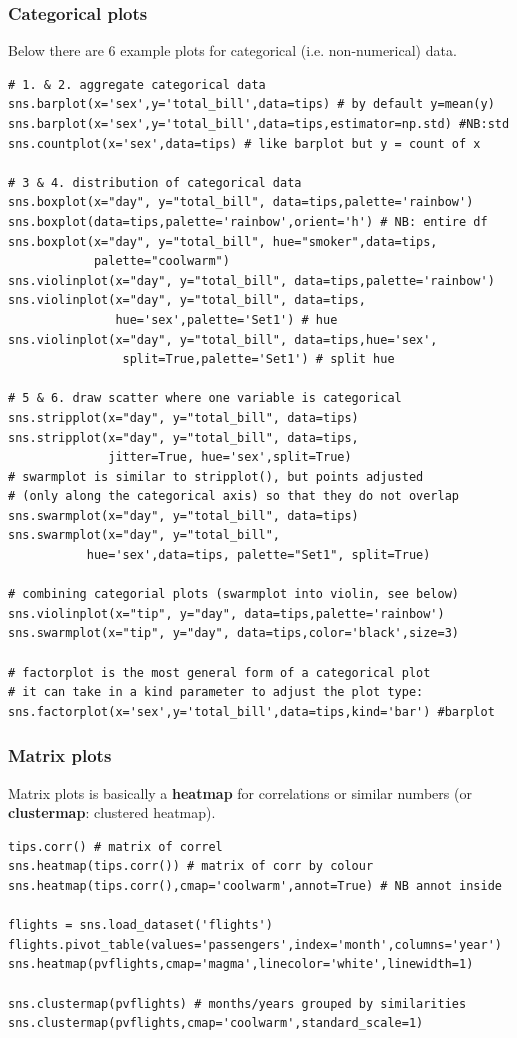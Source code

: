\documentclass[11pt]{article}
\begin{document}
\subsubsection{Categorical plots}
Below there are 6 example plots for categorical (i.e. non-numerical) data.
\begin{lstlisting}
# 1. & 2. aggregate categorical data
sns.barplot(x='sex',y='total_bill',data=tips) # by default y=mean(y)
sns.barplot(x='sex',y='total_bill',data=tips,estimator=np.std) #NB:std
sns.countplot(x='sex',data=tips) # like barplot but y = count of x

# 3 & 4. distribution of categorical data
sns.boxplot(x="day", y="total_bill", data=tips,palette='rainbow')
sns.boxplot(data=tips,palette='rainbow',orient='h') # NB: entire df
sns.boxplot(x="day", y="total_bill", hue="smoker",data=tips,
            palette="coolwarm")
sns.violinplot(x="day", y="total_bill", data=tips,palette='rainbow')
sns.violinplot(x="day", y="total_bill", data=tips,
               hue='sex',palette='Set1') # hue
sns.violinplot(x="day", y="total_bill", data=tips,hue='sex',
                split=True,palette='Set1') # split hue

# 5 & 6. draw scatter where one variable is categorical
sns.stripplot(x="day", y="total_bill", data=tips)
sns.stripplot(x="day", y="total_bill", data=tips,
              jitter=True, hue='sex',split=True)
# swarmplot is similar to stripplot(), but points adjusted 
# (only along the categorical axis) so that they do not overlap
sns.swarmplot(x="day", y="total_bill", data=tips)
sns.swarmplot(x="day", y="total_bill",
           hue='sex',data=tips, palette="Set1", split=True)

# combining categorial plots (swarmplot into violin, see below)
sns.violinplot(x="tip", y="day", data=tips,palette='rainbow')
sns.swarmplot(x="tip", y="day", data=tips,color='black',size=3)

# factorplot is the most general form of a categorical plot 
# it can take in a kind parameter to adjust the plot type:
sns.factorplot(x='sex',y='total_bill',data=tips,kind='bar') #barplot
\end{lstlisting}

\subsubsection{Matrix plots}
Matrix plots is basically a \textbf{heatmap} for correlations or similar numbers (or \textbf{clustermap}: clustered heatmap).
\begin{lstlisting}
tips.corr() # matrix of correl
sns.heatmap(tips.corr()) # matrix of corr by colour
sns.heatmap(tips.corr(),cmap='coolwarm',annot=True) # NB annot inside

flights = sns.load_dataset('flights')
flights.pivot_table(values='passengers',index='month',columns='year')
sns.heatmap(pvflights,cmap='magma',linecolor='white',linewidth=1) 

sns.clustermap(pvflights) # months/years grouped by similarities
sns.clustermap(pvflights,cmap='coolwarm',standard_scale=1) 
\end{lstlisting}
\end{document}
